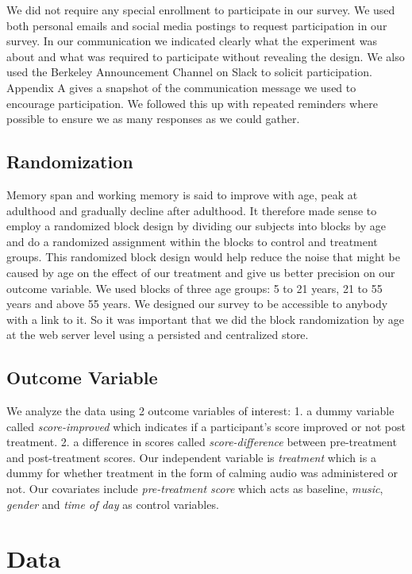\documentclass[journal,onecolumn, 12pt]{article}
\begin{document}
We did not require any special enrollment to participate in our survey. We used both personal emails and social media postings to request participation in our survey. In our communication we indicated clearly what the experiment was about and what was required to participate without revealing the design. We also used the Berkeley Announcement Channel on Slack to solicit participation. Appendix A gives a snapshot of the communication message we used to encourage participation. We followed this up with repeated reminders where possible to ensure we as many responses as we could gather. 

\subsection{Randomization}

Memory span and working memory is said to improve with age, peak at adulthood and gradually decline after adulthood. It therefore made sense to employ a randomized block design by dividing our subjects into blocks by age and do a randomized assignment within the blocks to control and treatment groups. This randomized block design would help reduce the noise that might be caused by age on the effect of our treatment and give us better precision on our outcome variable.  We used blocks of three age groups: 5 to 21 years, 21 to 55 years and above 55 years. We designed our survey to be accessible to anybody with a link to it. So it was important that we did the block randomization by age at the web server level using a persisted and centralized store. 

\subsection{Outcome Variable}

We analyze the data using 2 outcome variables of interest: 1. a dummy variable called \textit{score-improved} which indicates if a participant's score improved or not post treatment. 2. a difference in scores called \textit{score-difference} between pre-treatment and post-treatment scores. Our independent variable is \textit{treatment} which is a dummy for whether treatment in the form of calming audio was administered or not. Our covariates include \textit{pre-treatment score} which acts as baseline,  \textit{music}, \textit{gender} and \textit{time of day} as control variables.

\section{Data}  
\end{document}
